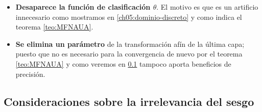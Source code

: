 \begin{itemize}
    \item \textbf{Desaparece la función de clasificación $\theta$}. El motivo es que es un artificio innecesario como mostramos en \ref{ch05:dominio-discreto} y como indica el teorema \ref{teo:MFNAUA}.
    \item \textbf{Se elimina un parámetro} de la transformación afín de la última capa; puesto que no es necesario para la convergencia de nuevo por el teorema \ref{teo:MFNAUA} y como veremos en \ref{consideration-irrelevancia-sesgo} tampoco aporta beneficios de precisión. 
\end{itemize}



\subsection{Consideraciones sobre la irrelevancia del sesgo}
\label{consideration-irrelevancia-sesgo}
